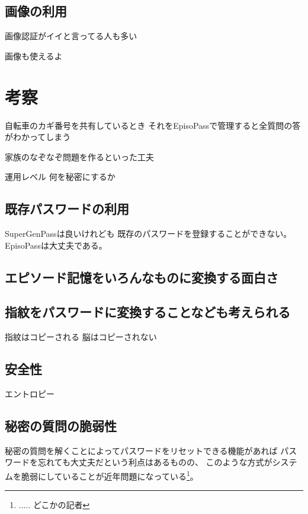 \documentclass[twoside]{wiss}
\begin{document}
\subsection{画像の利用}

画像認証がイイと言ってる人も多い

画像も使えるよ

\section{考察}

自転車のカギ番号を共有しているとき
それをEpisoPassで管理すると全質問の答がわかってしまう

家族のなぞなぞ問題を作るといった工夫

運用レベル
  何を秘密にするか


\subsection{既存パスワードの利用}

SuperGenPass\cite{SuperGenPass}は良いけれども
既存のパスワードを登録することができない。
EpisoPassは大丈夫である。

\subsection{エピソード記憶をいろんなものに変換する面白さ}

\subsection{指紋をパスワードに変換することなども考えられる}

指紋はコピーされる
脳はコピーされない

\subsection{安全性}

エントロピー

\subsection{秘密の質問の脆弱性}

秘密の質問を解くことによってパスワードをリセットできる機能があれば
パスワードを忘れても大丈夫だという利点はあるものの、
このような方式がシステムを脆弱にしていることが近年問題になっている\footnote{
  ..... どこかの記者
}。
\end{document}
